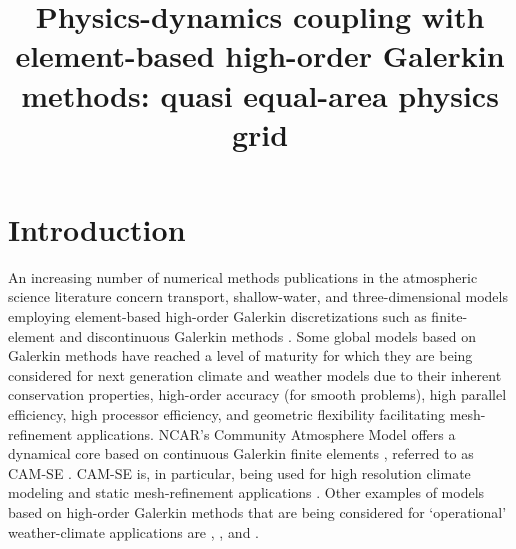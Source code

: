 \documentclass[twocol]{ametsoc}
\title{Physics-dynamics coupling with element-based high-order Galerkin methods: quasi equal-area physics grid}
\affiliation{School of Marine and Atmospheric Sciences, Stony Brook University, Stony Brook, New York, USA.}
\begin{document}
\maketitle


%

\section{Introduction}
An increasing number of numerical methods publications in the atmospheric science literature concern transport, shallow-water, and three-dimensional models employing element-based high-order Galerkin discretizations such as finite-element and discontinuous Galerkin methods \citep[for an introduction to these methods see, e.g., ][]{Durran,NLL2011LNCSE,U2014GMD}. Some global models based on Galerkin methods have reached a level of maturity for which they are being considered for next generation climate and weather models due to their inherent conservation properties, high-order accuracy (for smooth problems), high parallel efficiency, high processor efficiency, and geometric flexibility facilitating mesh-refinement applications. NCAR's Community Atmosphere Model \citep[CAM; ][]{CAM5} offers a dynamical core based on continuous Galerkin finite elements \citep{TF2010JCP}, referred to as CAM-SE \citep[CAM Spectral Elements; ][]{TES2008JPCS,DetAl2012IJHPCA,LetAl2018JAMES}. CAM-SE is, in particular, being used for high resolution climate modeling \citep[e.g., ][]{JAME:JAME20125,RetAl2015GRL,BETAL2018CC} and static mesh-refinement applications \citep[e.g., ][]{FT2004MWR,ZetAl2014JC,ZetAl2014JCb,GetAl2014GMD,RHUZ2016JAMC}. Other examples of models based on high-order Galerkin methods that are being considered for `operational' weather-climate applications are \citet{Giraldo20083849}, \citet{NCT2009CF}, \citet{BSBDK2013TCFD} and {\color{red}\citet{E3SM2018}{}}.
\end{document}
